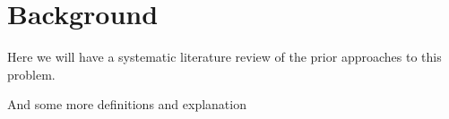 \chapter{Background}
Here we will have a systematic literature review of the prior
approaches to this problem.

And some more definitions and explanation
